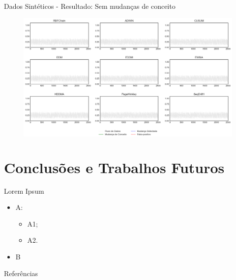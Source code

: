 \documentclass[10pt]{beamer}
\begin{document}
\begin{frame}{Dados Sintéticos - Resultado: Sem mudanças de conceito}
    \begin{figure}[t]
        \begin{center}
            \includegraphics[width=\textwidth]{imagens/nochange.png}
        \end{center}
    \end{figure}
\end{frame}

\section{Conclusões e Trabalhos Futuros}

\begin{frame}{Lorem Ipsum}
    \begin{itemize}
        \item<1 -> A:
        \begin{itemize}
            \item<2 -> A1;
            \item<2 -> A2.
        \end{itemize}
        \item<3 -> B
      \end{itemize}
\end{frame}

\begin{frame}[allowframebreaks]{Referências}

  
  

\end{frame}
\end{document}
